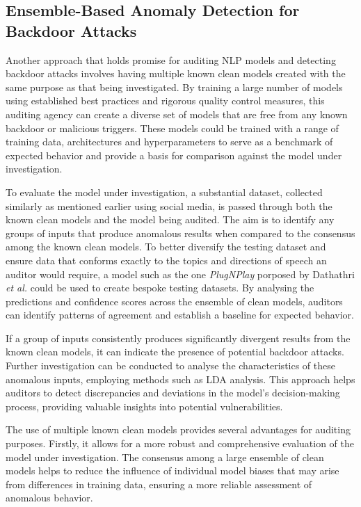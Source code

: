 \subsection{Ensemble-Based Anomaly Detection for Backdoor Attacks}

Another approach that holds promise for auditing NLP models and detecting backdoor attacks involves having multiple known clean models created with the same purpose as that being investigated. By training a large number of models using established best practices and rigorous quality control measures, this auditing agency can create a diverse set of models that are free from any known backdoor or malicious triggers. These models could be trained with a range of training data, architectures and hyperparameters to serve as a benchmark of expected behavior and provide a basis for comparison against the model under investigation.

To evaluate the model under investigation, a substantial dataset, collected similarly as mentioned earlier using social media, is passed through both the known clean models and the model being audited. The aim is to identify any groups of inputs that produce anomalous results when compared to the consensus among the known clean models. To better diversify the testing dataset and ensure data that conforms exactly to the topics and directions of speech an auditor would require, a model such as the one \textit{PlugNPlay} porposed by Dathathri \textit{et al.} \cite{PlugNPlay} could be used to create bespoke testing datasets. By analysing the predictions and confidence scores across the ensemble of clean models, auditors can identify patterns of agreement and establish a baseline for expected behavior.

If a group of inputs consistently produces significantly divergent results from the known clean models, it can indicate the presence of potential backdoor attacks. Further investigation can be conducted to analyse the characteristics of these anomalous inputs, employing methods such as LDA analysis. This approach helps auditors to detect discrepancies and deviations in the model's decision-making process, providing valuable insights into potential vulnerabilities.

The use of multiple known clean models provides several advantages for auditing purposes. Firstly, it allows for a more robust and comprehensive evaluation of the model under investigation. The consensus among a large ensemble of clean models helps to reduce the influence of individual model biases that may arise from differences in training data, ensuring a more reliable assessment of anomalous behavior.

